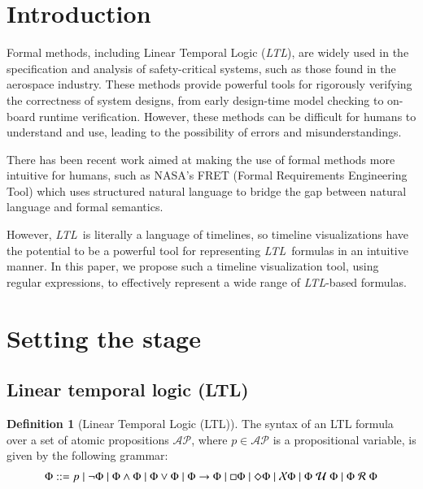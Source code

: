 \documentclass[preprint,12pt]{elsarticle}
\theoremstyle{definition}
\newtheorem{definition}{Definition}[section]
\theoremstyle{remark}
\newcommand{\AP}{\mathcal{AP}}
\newcommand{\always}{\Box}
\newcommand{\eventually}{\Diamond}
\newcommand{\nextt}{\mathcal{X}}
\newcommand{\limplies}{\rightarrow}
\newcommand{\ltl}{\textit{LTL}}
\newcommand{\stronguntil}{\hspace{0.1cm} \mathcal{U}  \hspace{0.1cm}}
\newcommand{\weakrelease}{\hspace{0.1cm} \mathcal{R} \hspace{0.1cm}}
\begin{document}
\section{Introduction}

Formal methods, including Linear Temporal Logic (\ltl), are widely used in the specification and analysis of safety-critical systems, such as those found in the aerospace industry. These methods provide powerful tools for rigorously verifying the correctness of system designs, from early design-time model checking to on-board runtime verification. However, these methods can be difficult for humans to understand and use, leading to the possibility of errors and misunderstandings.

There has been recent work aimed at making the use of formal methods more intuitive for humans, such as NASA's FRET (Formal Requirements Engineering Tool) \cite{GPMS20} which uses structured natural language to bridge the gap between natural language and formal semantics.

However, \ltl\ is literally a language of timelines, so timeline visualizations have the potential to be a powerful tool for representing \ltl\ formulas in an intuitive manner. In this paper, we propose such a timeline visualization tool, using regular expressions, to effectively represent a wide range of \ltl-based formulas.

\section{Setting the stage}

\subsection{Linear temporal logic (LTL)}

\begin{definition}[Linear Temporal Logic (LTL)]
    The syntax of an LTL formula over a set of atomic propositions $\AP$, where $p\in\AP$ is a propositional variable, is given by the following grammar:
    \begin{align*}
        \Phi ::= p \mid \neg \Phi \mid \Phi \land \Phi \mid \Phi \lor \Phi \mid \Phi \limplies \Phi \mid \always \Phi \mid \eventually \Phi \mid \nextt \Phi \mid \Phi \stronguntil \Phi \mid \Phi \weakrelease \Phi
    \end{align*}\label{ltl-defn}
\end{definition}
\end{document}
